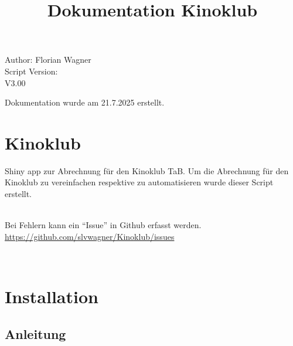 \documentclass[
]{article}
\title{Dokumentation Kinoklub}
\author{}
\date{\vspace{-2.5em}}
\begin{document}
\maketitle

Author: Florian Wagner\\
Script Version:\\
V3.00

Dokumentation wurde am 21.7.2025 erstellt.

\section{Kinoklub}\label{kinoklub}

Shiny app zur Abrechnung für den Kinoklub TaB. Um die Abrechnung für den
Kinoklub zu vereinfachen respektive zu automatisieren wurde dieser
Script erstellt.\\
\strut \\
Bei Fehlern kann ein ``Issue'' in Github erfasst werden.\\
\url{https://github.com/slvwagner/Kinoklub/issues}\strut \\

\section{Installation}\label{installation}

\subsection{Anleitung}\label{anleitung}
\end{document}
